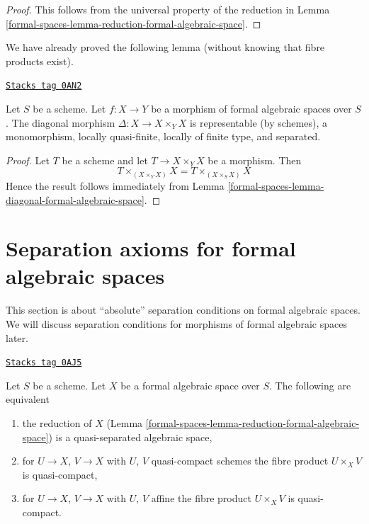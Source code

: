 \begin{proof}
This follows from the universal property of the reduction
in Lemma \ref{formal-spaces-lemma-reduction-formal-algebraic-space}.
\end{proof}

We have already proved the following lemma (without knowing that
fibre products exist).

\begin{lemma}
\label{formal-spaces-lemma-diagonal-morphism-formal-algebraic-spaces}
\href{https://stacks.math.columbia.edu/tag/0AN2}{\texttt{Stacks tag 0AN2}}

Let $S$ be a scheme. Let $f : X \to Y$ be a morphism of formal algebraic spaces
over $S$. The diagonal morphism $\Delta : X \to X \times_Y X$
is representable (by schemes), a monomorphism, locally quasi-finite,
locally of finite type, and separated.
\end{lemma}

\begin{proof}
Let $T$ be a scheme and let $T \to X \times_Y X$ be a morphism.
Then
$$
T \times_{(X \times_Y X)} X = T \times_{(X \times_S X)} X
$$
Hence the result follows immediately from
Lemma \ref{formal-spaces-lemma-diagonal-formal-algebraic-space}.
\end{proof}

\section{Separation axioms for formal algebraic spaces}
\label{formal-spaces-section-separation}
This section is about ``absolute'' separation conditions on formal algebraic
spaces. We will discuss separation conditions for morphisms of formal
algebraic spaces later.

\begin{lemma}
\label{formal-spaces-lemma-characterize-quasi-separated}
\href{https://stacks.math.columbia.edu/tag/0AJ5}{\texttt{Stacks tag 0AJ5}}

Let $S$ be a scheme. Let $X$ be a formal algebraic space over $S$.
The following are equivalent
\begin{enumerate}
\item the reduction of $X$
(Lemma \ref{formal-spaces-lemma-reduction-formal-algebraic-space}) is a
quasi-separated algebraic space,
\item for $U \to X$, $V \to X$ with $U$, $V$ quasi-compact schemes
the fibre product $U \times_X V$ is quasi-compact,
\item for $U \to X$, $V \to X$ with $U$, $V$ affine
the fibre product $U \times_X V$ is quasi-compact.
\end{enumerate}
\end{lemma}

